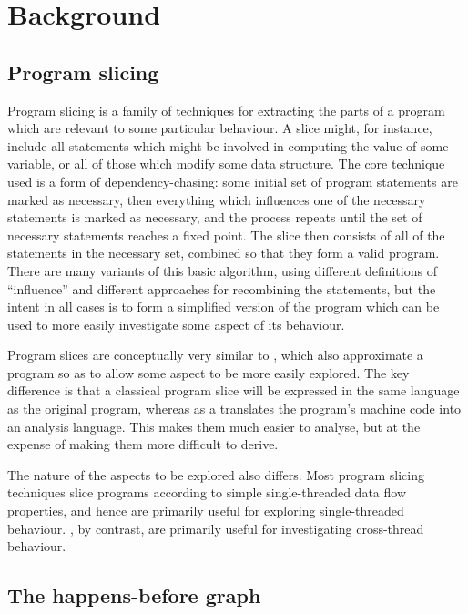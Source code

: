 \section{Background}


\subsection{Program slicing}

Program slicing\cite{Weiser1981} is a family of techniques for
extracting the parts of a program which are relevant to some
particular behaviour.  A slice might, for instance, include all
statements which might be involved in computing the value of some
variable, or all of those which modify some data structure.  The core
technique used is a form of dependency-chasing: some initial set of
program statements are marked as necessary, then everything which
influences one of the necessary statements is marked as necessary, and
the process repeats until the set of necessary statements reaches a
fixed point.  The slice then consists of all of the statements in the
necessary set, combined so that they form a valid program.  There are
many variants of this basic algorithm, using different definitions of
``influence'' and different approaches for recombining the statements,
but the intent in all cases is to form a simplified version of the
program which can be used to more easily investigate some aspect of
its behaviour.

Program slices are conceptually very similar to {\StateMachines},
which also approximate a program so as to allow some aspect to be more
easily explored.  The key difference is that a classical program slice
will be expressed in the same language as the original program,
whereas as a {\StateMachine} translates the program's machine code
into an analysis language.  This makes them much easier to analyse,
but at the expense of making them more difficult to derive.

 The nature of the aspects to be explored
also differs.  Most program slicing techniques slice programs
according to simple single-threaded data flow properties, and hence
are primarily useful for exploring single-threaded behaviour.
{\Technique} {\StateMachines}, by contrast, are primarily useful for
investigating cross-thread behaviour.

\subsection{The happens-before graph}

